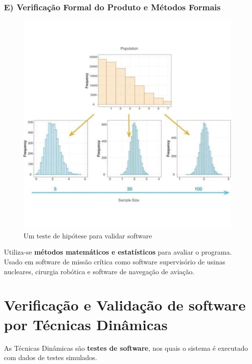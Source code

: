 \documentclass[
]{book}
\begin{document}
\subsubsection{E) Verificação Formal do Produto e Métodos Formais}\label{e-verificauxe7uxe3o-formal-do-produto-e-muxe9todos-formais}

\begin{figure}
\centering
\includegraphics{images/estatistica.jpg}
\caption{Um teste de hipótese para validar software}
\end{figure}

Utiliza-se \textbf{métodos matemáticos e estatísticos} para avaliar o programa. Usado em software de missão crítica como software supervisório de usinas nucleares, cirurgia robótica e software de navegação de aviação.

\section{Verificação e Validação de software por Técnicas Dinâmicas}\label{verificauxe7uxe3o-e-validauxe7uxe3o-de-software-por-tuxe9cnicas-dinuxe2micas}

As Técnicas Dinâmicas são \textbf{testes de software}, nos quais o sistema é executado com dados de testes simulados.
\end{document}
